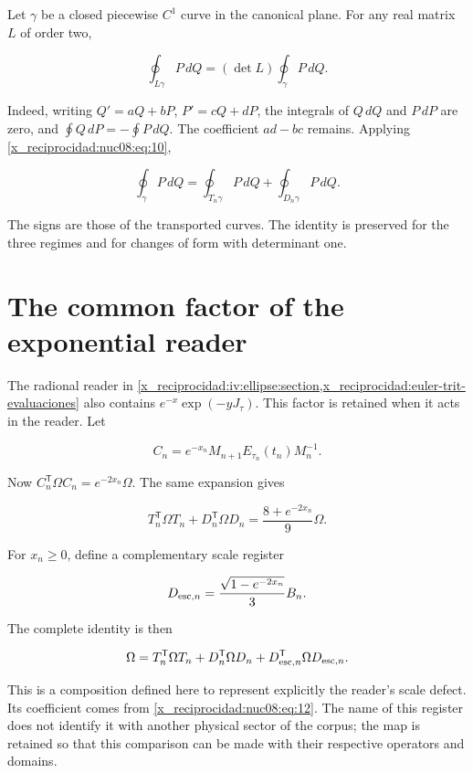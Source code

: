 Let \(\gamma\) be a closed piecewise \(C^1\) curve in the canonical plane. For any real matrix \(L\) of order two,

\[
\oint_{L\gamma}P\,dQ=(\det L)\oint_\gamma P\,dQ.
\]

Indeed, writing \(Q'=aQ+bP\), \(P'=cQ+dP\), the integrals of \(Q\,dQ\) and \(P\,dP\) are zero, and \(\oint Q\,dP=-\oint P\,dQ\). The coefficient \(ad-bc\) remains. Applying \eqref{x_reciprocidad:nuc08:eq:10},

\begin{equation}
\boxed{\oint_\gamma P\,dQ
=\oint_{T_n\gamma}P\,dQ+\oint_{D_n\gamma}P\,dQ.}
\label{x_reciprocidad:nuc08:eq:11}
\end{equation}

The signs are those of the transported curves. The identity is preserved for the three regimes and for changes of form with determinant one.

\section{The common factor of the exponential reader}

The radional reader in \cref{x_reciprocidad:iv:ellipse:section,x_reciprocidad:euler-trit-evaluaciones} also contains \(e^{-x}\exp(-yJ_\tau)\). This factor is retained when it acts in the reader. Let

\[
C_n=e^{-x_n}M_{n+1}E_{\tau_n}(t_n)M_n^{-1}.
\]

Now \(C_n^\mathsf T\Omega C_n=e^{-2x_n}\Omega\). The same expansion gives

\begin{equation}
T_n^\mathsf T\Omega T_n+D_n^\mathsf T\Omega D_n
=\frac{8+e^{-2x_n}}9\Omega.
\label{x_reciprocidad:nuc08:eq:12}
\end{equation}

For \(x_n\geq0\), define a complementary scale register

\[
D_{{\rm esc},n}=\frac{\sqrt{1-e^{-2x_n}}}{3}B_n.
\]

The complete identity is then

\begin{equation}
\Omega=T_n^\mathsf T\Omega T_n+D_n^\mathsf T\Omega D_n
+D_{{\rm esc},n}^\mathsf T\Omega D_{{\rm esc},n}.
\label{x_reciprocidad:nuc08:eq:13}
\end{equation}

This is a composition defined here to represent explicitly the reader's scale defect. Its coefficient comes from \eqref{x_reciprocidad:nuc08:eq:12}. The name of this register does not identify it with another physical sector of the corpus; the map is retained so that this comparison can be made with their respective operators and domains.

